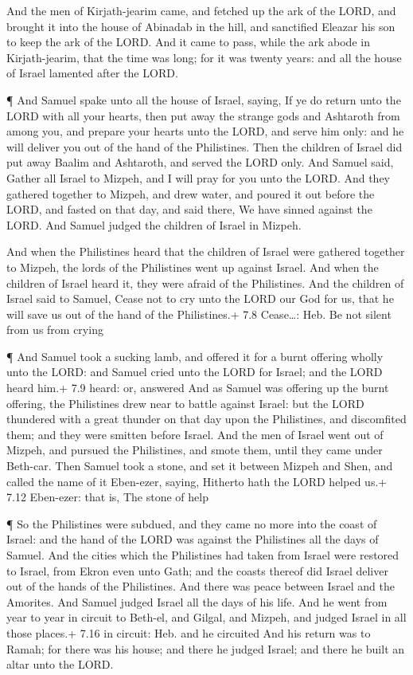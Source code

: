  And the men of Kirjath-jearim came, and fetched up the ark
of the LORD, and brought it into the house of Abinadab in the hill, and
sanctified Eleazar his son to keep the ark of the LORD.  And
it came to pass, while the ark abode in Kirjath-jearim, that the time
was long; for it was twenty years: and all the house of Israel lamented
after the LORD.

 ¶ And Samuel spake unto all the house of Israel, saying, If
ye do return unto the LORD with all your hearts, then put away the
strange gods and Ashtaroth from among you, and prepare your hearts unto
the LORD, and serve him only: and he will deliver you out of the hand of
the Philistines.  Then the children of Israel did put away
Baalim and Ashtaroth, and served the LORD only.  And Samuel
said, Gather all Israel to Mizpeh, and I will pray for you unto the
LORD.  And they gathered together to Mizpeh, and drew water,
and poured it out before the LORD, and fasted on that day, and said
there, We have sinned against the LORD. And Samuel judged the children
of Israel in Mizpeh.

 And when the Philistines heard that the children of Israel
were gathered together to Mizpeh, the lords of the Philistines went up
against Israel. And when the children of Israel heard it, they were
afraid of the Philistines.  And the children of Israel said
to Samuel, Cease not to cry unto the LORD our God for us, that he will
save us out of the hand of the Philistines.+ 7.8 Cease\ldots: Heb. Be
not silent from us from crying

 ¶ And Samuel took a sucking lamb, and offered it for a
burnt offering wholly unto the LORD: and Samuel cried unto the LORD for
Israel; and the LORD heard him.+ 7.9 heard: or, answered 
And as Samuel was offering up the burnt offering, the Philistines drew
near to battle against Israel: but the LORD thundered with a great
thunder on that day upon the Philistines, and discomfited them; and they
were smitten before Israel.  And the men of Israel went out
of Mizpeh, and pursued the Philistines, and smote them, until they came
under Beth-car.  Then Samuel took a stone, and set it
between Mizpeh and Shen, and called the name of it Eben-ezer, saying,
Hitherto hath the LORD helped us.+ 7.12 Eben-ezer: that is, The stone of
help

 ¶ So the Philistines were subdued, and they came no more
into the coast of Israel: and the hand of the LORD was against the
Philistines all the days of Samuel.  And the cities which
the Philistines had taken from Israel were restored to Israel, from
Ekron even unto Gath; and the coasts thereof did Israel deliver out of
the hands of the Philistines. And there was peace between Israel and the
Amorites.  And Samuel judged Israel all the days of his
life.  And he went from year to year in circuit to Beth-el,
and Gilgal, and Mizpeh, and judged Israel in all those places.+ 7.16 in
circuit: Heb. and he circuited  And his return was to
Ramah; for there was his house; and there he judged Israel; and there he
built an altar unto the LORD.


